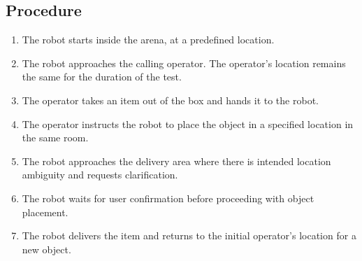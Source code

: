 \subsection*{Procedure}
\begin{enumerate}[nosep]
	\item The robot starts inside the arena, at a predefined location.
	\item The robot approaches the calling operator. The operator's location remains the same for the duration of the test.
	\item The operator takes an item out of the box and hands it to the robot. 
	\item The operator instructs the robot to place the object in a specified location in the same room.
	\item The robot approaches the delivery area where there is intended location ambiguity and requests clarification.
	\item The robot waits for user confirmation before proceeding with object placement.
	\item The robot delivers the item and returns to the initial operator's location for a new object.
\end{enumerate}

